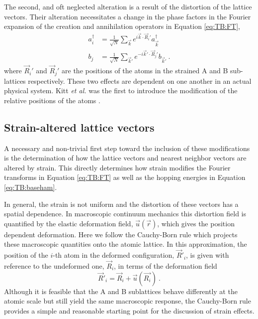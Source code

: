 The second, and oft neglected alteration is a result of the distortion of the lattice vectors.
Their alteration necessitates a change in the phase factors in the Fourier expansion of the creation and annihilation operators in Equation \ref{eq:TB:FT},
\begin{align}
  a_i^{\dagger}&=\frac{1}{\sqrt{N}}\sum_{\vec{k} } e^{ i \vec{k}  \cdot \vec{R}_i'} a_{\vec{k} }^{\dagger} \nonumber \\
  b_j          &=\frac{1}{\sqrt{N}}\sum_{\vec{k}'} e^{-i \vec{k}' \cdot \vec{R}_j'} b_{\vec{k}'} \ . \label{eq:PVP:FT} 
\end{align}
where $\vec{R}_i'$ and $\vec{R}_j'$ are the positions of the atoms in the strained A and B sub-lattices respectively.
These two effects are dependent on one another in an actual physical system.
Kitt \textit{et al.} was the first to introduce the modification of the relative positions of the atoms \cite{Kitt2012}.

\subsection{Strain-altered lattice vectors \label{sub:PVP:straindistances}}
A necessary and non-trivial first step toward the inclusion of these modifications is the determination of how the lattice vectors and nearest neighbor vectors are altered by strain.
This directly determines how strain modifies the Fourier transforms in Equation \ref{eq:TB:FT} as well as the hopping energies in Equation \ref{eq:TB:baseham}.

In general, the strain is not uniform and the distortion of these vectors has a spatial dependence.
In macroscopic continuum mechanics this distortion field is quantified by the elastic deformation field, $\vec{u}(\vec{r})$, which gives the position dependent deformation.
Here we follow the Cauchy-Born rule which projects these macroscopic quantities onto the atomic lattice.
In this approximation, the position of the $i$-th atom in the deformed configuration, $\vec{R}'_i$, is given with reference to the undeformed one, $\vec{R}_i$, in terms of the deformation field
\begin{equation*}
  \vec{R}'_{i}=\vec{R}_{i}+\vec{u}(\vec{R_i}) \ .
\end{equation*}
Although it is feasible that the A and B sublattices behave differently at the atomic scale but still yield the same macroscopic response, the Cauchy-Born rule provides a simple and reasonable starting point for the discussion of strain effects.

